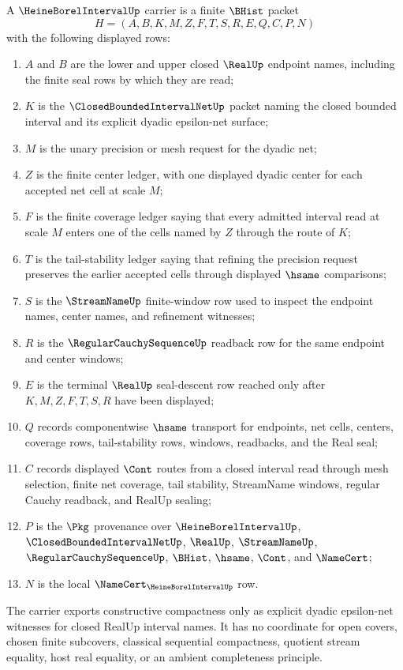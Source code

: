 \begin{definition}
\label{def:heine-borel-interval-carrier}
A $\HeineBorelIntervalUp$ carrier is a finite $\BHist$ packet
$$
H=(A,B,K,M,Z,F,T,S,R,E,Q,C,P,N)
$$
with the following displayed rows:
\begin{enumerate}
\item $A$ and $B$ are the lower and upper closed $\RealUp$ endpoint names, including the finite seal rows by which they are read;
\item $K$ is the $\ClosedBoundedIntervalNetUp$ packet naming the closed bounded interval and its explicit dyadic epsilon-net surface;
\item $M$ is the unary precision or mesh request for the dyadic net;
\item $Z$ is the finite center ledger, with one displayed dyadic center for each accepted net cell at scale $M$;
\item $F$ is the finite coverage ledger saying that every admitted interval read at scale $M$ enters one of the cells named by $Z$ through the route of $K$;
\item $T$ is the tail-stability ledger saying that refining the precision request preserves the earlier accepted cells through displayed $\hsame$ comparisons;
\item $S$ is the $\StreamNameUp$ finite-window row used to inspect the endpoint names, center names, and refinement witnesses;
\item $R$ is the $\RegularCauchySequenceUp$ readback row for the same endpoint and center windows;
\item $E$ is the terminal $\RealUp$ seal-descent row reached only after $K,M,Z,F,T,S,R$ have been displayed;
\item $Q$ records componentwise $\hsame$ transport for endpoints, net cells, centers, coverage rows, tail-stability rows, windows, readbacks, and the Real seal;
\item $C$ records displayed $\Cont$ routes from a closed interval read through mesh selection, finite net coverage, tail stability, StreamName windows, regular Cauchy readback, and RealUp sealing;
\item $P$ is the $\Pkg$ provenance over $\HeineBorelIntervalUp$, $\ClosedBoundedIntervalNetUp$, $\RealUp$, $\StreamNameUp$, $\RegularCauchySequenceUp$, $\BHist$, $\hsame$, $\Cont$, and $\NameCert$;
\item $N$ is the local $\NameCert_{\HeineBorelIntervalUp}$ row.
\end{enumerate}
The carrier exports constructive compactness only as explicit dyadic epsilon-net witnesses for closed RealUp interval names. It has no coordinate for open covers, chosen finite subcovers, classical sequential compactness, quotient stream equality, host real equality, or an ambient completeness principle.
\end{definition}

